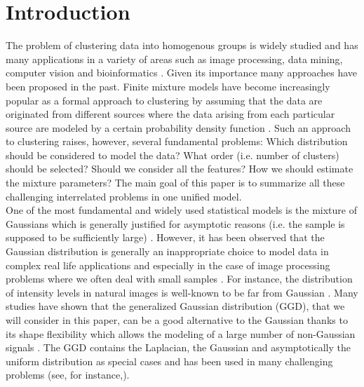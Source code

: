 \documentclass[journal,10pt]{elsart}
\begin{document}
\section{Introduction}
The problem of clustering data into homogenous groups is widely studied and has many applications in a variety of areas such as image processing, data mining, computer vision and bioinformatics \cite{Jain1999}. Given its importance many approaches have been proposed in the past. Finite mixture models have become increasingly popular as a formal approach to clustering by assuming that the data are originated from different sources where the data arising from each particular source are modeled by a certain probability density function \cite{McLachlan2000}. Such an approach to clustering raises, however, several fundamental problems: Which distribution should be considered to model the data? What order (i.e. number of clusters) should be selected? Should we consider all the features? How we should estimate the mixture parameters? The main goal of this paper is to summarize all these challenging interrelated problems in one unified model.
\\
One of the most fundamental and widely used statistical models is the mixture of Gaussians which is generally justified for asymptotic reasons (i.e. the sample is supposed to be sufficiently large) \cite{Robert2007}. However, it has been observed that the Gaussian distribution is generally an inappropriate choice to model data in complex real life applications \cite{Palacios2006} and especially in the case of image processing problems where we often deal with small samples \cite{Meignen2006}. For instance, the distribution of intensity levels in natural images is well-known to be far from Gaussian \cite{Field1994,Huang1999,Simoncelli2003,Laptev2009}. Many studies have shown that the generalized Gaussian distribution (GGD), that we will consider in this paper, can be a good alternative to the Gaussian thanks to its shape flexibility which allows the modeling of a large number of non-Gaussian signals \cite{Miller1972,Farvardin1984,Gao1995,Guebaly2011}. The GGD contains the Laplacian, the Gaussian and asymptotically the uniform distribution as special cases \cite{Mauer1979} and has been used in many challenging problems (see, for instance,\cite{Mallat1989,Do2002,Allili2008}).
\end{document}

